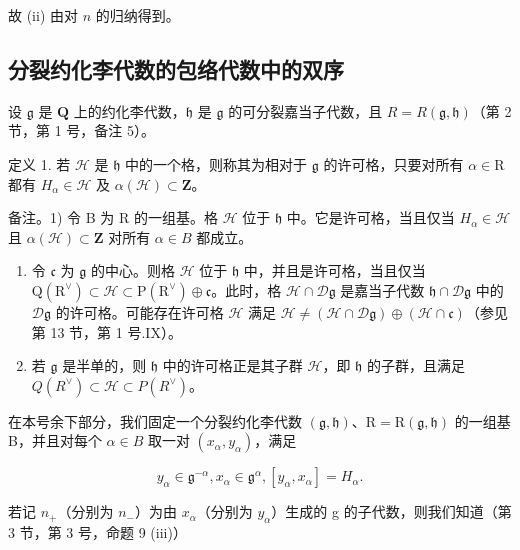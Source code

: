 故 (ii) 由对 \(n\) 的归纳得到。

\subsection{分裂约化李代数的包络代数中的双序}

设 \(\mathfrak{g}\) 是 \(\mathbf{Q}\) 上的约化李代数，\(\mathfrak{h}\) 是 \(\mathfrak{g}\) 的可分裂嘉当子代数，且 \(R = R(\mathfrak{g},\mathfrak{h})\)（第 2 节，第 1 号，备注 5）。

定义 1. 若 \(\mathcal{H}\) 是 \(\mathfrak{h}\) 中的一个格，则称其为相对于 \(\mathfrak{g}\) 的许可格，只要对所有 \(\alpha \in \mathrm{R}\) 都有 \(H_{\alpha} \in \mathcal{H}\) 及 \(\alpha(\mathcal{H}) \subset \mathbf{Z}\)。

备注。1) 令 B 为 R 的一组基。格 \(\mathcal{H}\) 位于 \(\mathfrak{h}\) 中。它是许可格，当且仅当 \(H_{\alpha} \in \mathcal{H}\) 且 \(\alpha(\mathcal{H}) \subset \mathbf{Z}\) 对所有 \(\alpha \in B\) 都成立。

\begin{enumerate}
\def\labelenumi{\arabic{enumi})}
\setcounter{enumi}{1}
\item
  令 \(\mathfrak{c}\) 为 \(\mathfrak{g}\) 的中心。则格 \(\mathcal{H}\) 位于 \(\mathfrak{h}\) 中，并且是许可格，当且仅当 \(\mathrm{Q}(\mathrm{R}^{\vee}) \subset \mathcal{H} \subset \mathrm{P}(\mathrm{R}^{\vee}) \oplus \mathfrak{c}\)。此时，格 \(\mathcal{H} \cap \mathcal{D}\mathfrak{g}\) 是嘉当子代数 \(\mathfrak{h} \cap \mathcal{D}\mathfrak{g}\) 中的 \(\mathcal{D}\mathfrak{g}\) 的许可格。可能存在许可格 \(\mathcal{H}\) 满足 \(\mathcal{H} \neq (\mathcal{H} \cap \mathcal{D}\mathfrak{g}) \oplus (\mathcal{H} \cap \mathfrak{c})\)（参见第 13 节，第 1 号.IX）。
\item
  若 \(\mathfrak{g}\) 是半单的，则 \(\mathfrak{h}\) 中的许可格正是其子群 \(\mathcal{H}\)，即 \(\mathfrak{h}\) 的子群，且满足 \(Q(R^{\vee})\subset \mathcal{H}\subset P(R^{\vee})\)。
\end{enumerate}

在本号余下部分，我们固定一个分裂约化李代数 \((\mathfrak{g},\mathfrak{h})\)、\(\mathrm{R}=\mathrm{R}(\mathfrak{g},\mathfrak{h})\) 的一组基 B，并且对每个 \(\alpha\in B\) 取一对 \((x_{\alpha},y_{\alpha})\)，满足

\[
y _ {\alpha} \in \mathfrak {g} ^ {- \alpha}, x _ {\alpha} \in \mathfrak {g} ^ {\alpha}, [ y _ {\alpha}, x _ {\alpha} ] = H _ {\alpha}.\tag{20}
\]

若记 \(n_{+}\)（分别为 \(n_{-}\)）为由 \(x_{\alpha}\)（分别为 \(y_{\alpha}\)）生成的 g 的子代数，则我们知道（第 3 节，第 3 号，命题 9 (iii)）

